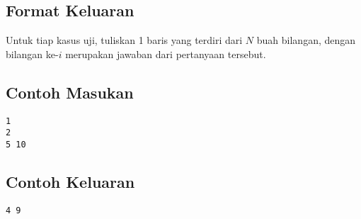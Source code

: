 \documentclass{article}
\begin{document}
\subsection*{Format Keluaran}

Untuk tiap kasus uji, tuliskan 1 baris yang terdiri dari $N$ buah bilangan, dengan bilangan ke-$i$ merupakan jawaban dari pertanyaan tersebut.
\\

\begin{multicols}{2}
\subsection*{Contoh Masukan}
\begin{lstlisting}
1
2
5 10
\end{lstlisting}
\columnbreak
\subsection*{Contoh Keluaran}
\begin{lstlisting}
4 9
\end{lstlisting}
\vfill
\null
\end{multicols}

\pagebreak
\end{document}
